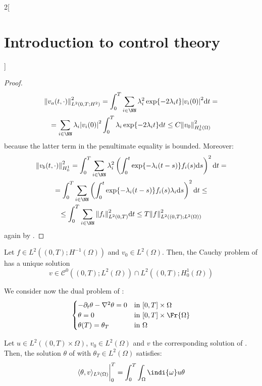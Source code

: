 \documentclass[../../../main_math.tex]{subfiles}
\begin{document}
\begin{multicols}{2}[\section{Introduction to control theory}]
\begin{proof}
    \begin{multline*}
      \norm{v_a(t,\cdot)}^2_{L^2(0,T;H^2)}=\int_0^T\sum_{i\in\NN}\lambda_i^2\exp{-2\lambda_i t}\abs{v_i(0)}^2\dd t=\\= \sum_{i\in\NN}\lambda_i\abs{v_i(0)}^2\int_0^T\lambda_i \exp{-2\lambda_i t}\dd t \leq C \norm{v_0}^2_{H_0^1(\Omega)}
    \end{multline*}
    because the latter term in the penultimate equality is bounded. Moreover:
    \begin{multline*}
      \norm{v_b(t,\cdot)}^2_{H_0^1} =\int_0^T\sum_{i\in\NN}\lambda_i^2 \left(\int_0^t\exp{-\lambda_i(t-s)}f_i(s)\dd s\right)^2\dd t=\\= \int_0^T \sum_{i\in\NN}\left(\int_0^t\exp{-\lambda_i(t-s)}f_i(s)\lambda_i\dd s\right)^2\dd t\leq\\\leq \int_0^T\sum_{i\in\NN}\norm{f_i}^2_{L^2(0,T)}\dd t \leq T \norm{f}^2_{L^2((0,T);L^2(\Omega))}
    \end{multline*}
    again by .
  \end{proof}
  \begin{theorem}
    Let $f\in L^2((0,T);H^{-1}(\Omega))$ and $v_0\in L^2(\Omega)$. Then, the Cauchy problem of  has a unique solution $$v\in \mathcal{C}^0((0,T); L^2(\Omega))\cap L^2((0,T); H_0^1(\Omega))$$
  \end{theorem}
  We consider now the dual problem of :
  \begin{equation}\label{ICT:heat_equation_control_dual}
    \begin{cases}
      -\partial_t\theta - \laplacian\theta = 0 & \text{in } [0,T]\times \Omega      \\
      \theta = 0                               & \text{in } [0,T]\times \Fr{\Omega} \\
      \theta(T) = \theta_T                     & \text{in } \Omega
    \end{cases}
  \end{equation}
  \begin{proposition}\label{ICT:duality}
    Let $u\in L^2((0,T)\times \Omega)$, $v_0\in L^2(\Omega)$ and $v$ the corresponding solution of . Then, the solution $\theta$ of  with $\theta_T\in L^2(\Omega)$ satisfies:
    $$
      \langle \theta, v\rangle_{L^2(\Omega)}\bigg|_0^T = \int_0^T\int_\Omega \indi{\omega}u \theta
    $$
  \end{proposition}

\end{multicols}
\end{document}
